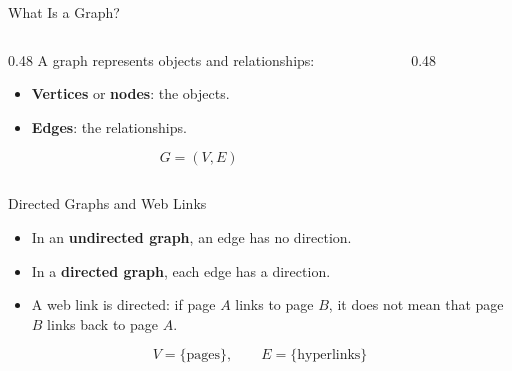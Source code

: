 \documentclass[aspectratio=169,11pt]{beamer}
\begin{document}
\begin{frame}{What Is a Graph?}
\begin{columns}[T,onlytextwidth]
\begin{column}{0.48\textwidth}
A graph represents objects and relationships:
\begin{itemize}
  \item \textbf{Vertices} or \textbf{nodes}: the objects.
  \item \textbf{Edges}: the relationships.
\end{itemize}

\[
G=(V,E)
\]
\end{column}
\begin{column}{0.48\textwidth}
\centering
{}
\end{column}
\end{columns}
\end{frame}

\begin{frame}{Directed Graphs and Web Links}
\begin{itemize}
  \item In an \textbf{undirected graph}, an edge has no direction.
  \item In a \textbf{directed graph}, each edge has a direction.
  \item A web link is directed: if page \(A\) links to page \(B\), it does not
  mean that page \(B\) links back to page \(A\).
\end{itemize}

\[
V = \{\text{pages}\}, \qquad E = \{\text{hyperlinks}\}
\]
\end{frame}
\end{document}
